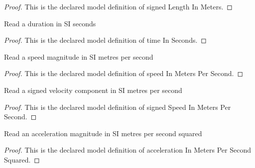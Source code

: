 \begin{proof}
  This is the declared model definition of signed Length In Meters.
\end{proof}
\begin{definition}
  \label{def:physics:phyx-mini-0742:phyxminiproblems-problemphyxmini0742-timeinseconds}
  Read a duration in SI seconds
\end{definition}
\begin{proof}
  This is the declared model definition of time In Seconds.
\end{proof}
\begin{definition}
  \label{def:physics:phyx-mini-0742:phyxminiproblems-problemphyxmini0742-speedinmeterspersecond}
  Read a speed magnitude in SI metres per second
\end{definition}
\begin{proof}
  This is the declared model definition of speed In Meters Per Second.
\end{proof}
\begin{definition}
  \label{def:physics:phyx-mini-0742:phyxminiproblems-problemphyxmini0742-signedspeedinmeterspersecond}
  Read a signed velocity component in SI metres per second
\end{definition}
\begin{proof}
  This is the declared model definition of signed Speed In Meters Per Second.
\end{proof}
\begin{definition}
  \label{def:physics:phyx-mini-0742:phyxminiproblems-problemphyxmini0742-accelerationinmeterspersecondsquared}
  Read an acceleration magnitude in SI metres per second squared
\end{definition}
\begin{proof}
  This is the declared model definition of acceleration In Meters Per Second Squared.
\end{proof}
